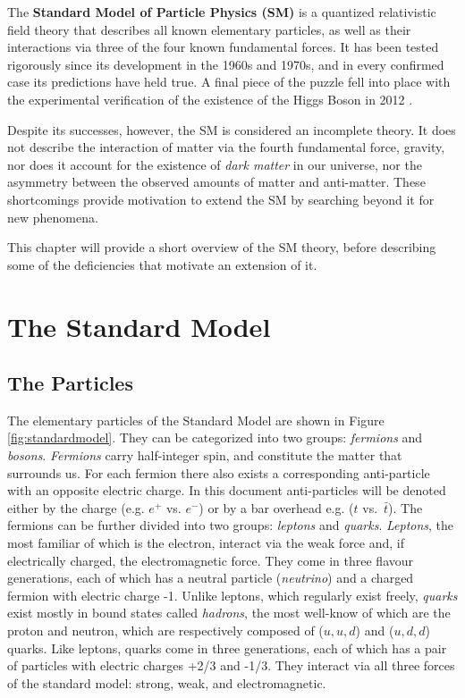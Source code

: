 \label{chapter:theory}

\newlength{\savedunitlength}
\setlength{\unitlength}{2em}

The \textbf{Standard Model of Particle Physics (SM)} \cite{peskin,schwartz,pdg_rev,Griffiths} is a quantized relativistic field theory that describes all known elementary particles, as well as their interactions via three of the four known fundamental forces. It has been tested rigorously since its development in the 1960s and 1970s, and in every confirmed case its predictions have held true. A final piece of the puzzle fell into place with the experimental verification of the existence of the Higgs Boson in 2012 \cite{HiggsDiscovery}.

Despite its successes, however, the SM is considered an incomplete theory. It does not describe the interaction of matter via the fourth fundamental force, gravity, nor does it account for the existence of \textit{dark matter} in our universe, nor the asymmetry between the observed amounts of matter and anti-matter. These shortcomings provide motivation to extend the SM by searching beyond it for new phenomena.

This chapter will provide a short overview of the SM theory, before describing some of the deficiencies that motivate an extension of it.

\section{The Standard Model}

\subsection{The Particles}
The elementary particles of the Standard Model are shown in Figure \ref{fig:standardmodel}. They can be categorized into two groups: \textit{fermions} and \textit{bosons}. \textit{Fermions} carry half-integer spin, and constitute the matter that surrounds us. For each fermion there also exists a corresponding anti-particle with an opposite electric charge. In this document anti-particles will be denoted either by the charge (e.g. $e^{+}$ vs. $e^{-}$) or by a bar overhead e.g. ($t$ vs.~$\bar{t}$). The fermions can be further divided into two groups: \textit{leptons} and \textit{quarks}. \textit{Leptons}, the most familiar of which is the electron, interact via the weak force and, if electrically charged, the electromagnetic force. They come in three flavour generations, each of which has a neutral particle (\textit{neutrino}) and a charged fermion with electric charge -1. Unlike leptons, which regularly exist freely, \textit{quarks} exist mostly in bound states called \textit{hadrons}, the most well-know of which are the proton and neutron, which are respectively composed of ($u,u,d$) and ($u,d,d$) quarks. Like leptons, quarks come in three generations, each of which has a pair of particles with electric charges +2/3 and -1/3. They interact via all three forces of the standard model: strong, weak, and electromagnetic.

